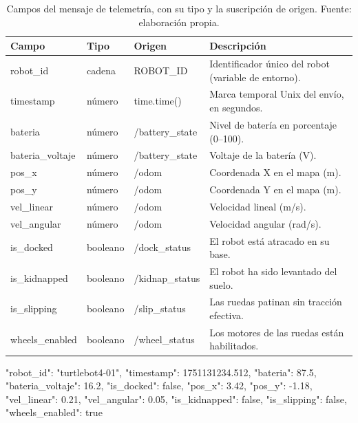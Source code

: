 \begin{table}[htbp]
  \centering
  \small
  \caption{Campos del mensaje de telemetría, con su tipo y la suscripción de origen. Fuente: elaboración propia.}
  \label{tab:telemetria}
  \begin{tabular}{@{}>{\ttfamily}l l >{\ttfamily}l >{\raggedright\arraybackslash}p{5.2cm}@{}}
    \toprule
    \textbf{\normalfont Campo} & \textbf{Tipo} & \textbf{\normalfont Origen} &
    \textbf{Descripción} \\
    \midrule
    robot\_id        & cadena   & ROBOT\_ID       & Identificador único del robot (variable de entorno). \\
    timestamp        & número   & time.time()     & Marca temporal Unix del envío, en segundos. \\
    bateria          & número   & /battery\_state & Nivel de batería en porcentaje (0--100). \\
    bateria\_voltaje & número   & /battery\_state & Voltaje de la batería (V). \\
    pos\_x           & número   & /odom           & Coordenada X en el mapa (m). \\
    pos\_y           & número   & /odom           & Coordenada Y en el mapa (m). \\
    vel\_linear      & número   & /odom           & Velocidad lineal (m/s). \\
    vel\_angular     & número   & /odom           & Velocidad angular (rad/s). \\
    is\_docked       & booleano & /dock\_status   & El robot está atracado en su base. \\
    is\_kidnapped    & booleano & /kidnap\_status & El robot ha sido levantado del suelo. \\
    is\_slipping     & booleano & /slip\_status   & Las ruedas patinan sin tracción efectiva. \\
    wheels\_enabled  & booleano & /wheel\_status  & Los motores de las ruedas están habilitados. \\
    \bottomrule
  \end{tabular}
\end{table}

%
\begin{jsoncode}[title={Ejemplo de mensaje de telemetría (topic robot\_telemetry)}, label={lst:telemetria-json}]
{
  "robot_id": "turtlebot4-01",
  "timestamp": 1751131234.512,
  "bateria": 87.5,
  "bateria_voltaje": 16.2,
  "is_docked": false,
  "pos_x": 3.42,
  "pos_y": -1.18,
  "vel_linear": 0.21,
  "vel_angular": 0.05,
  "is_kidnapped": false,
  "is_slipping": false,
  "wheels_enabled": true
}
\end{jsoncode}%

